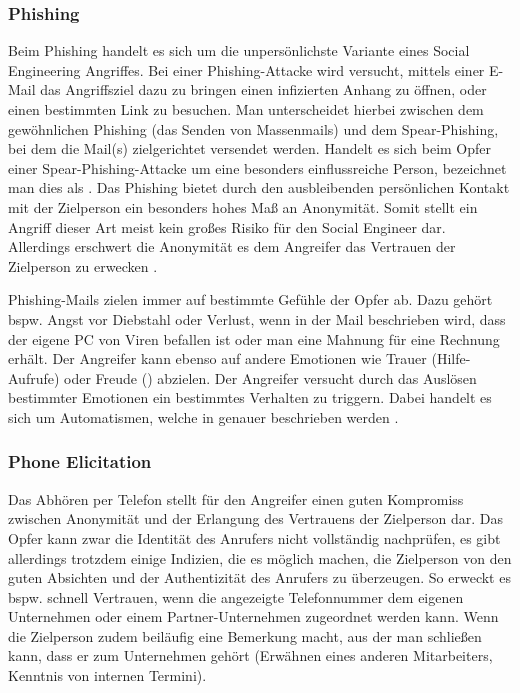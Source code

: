 \subsubsection{Phishing}
Beim Phishing handelt es sich um die unpersönlichste Variante eines Social Engineering Angriffes.
Bei einer Phishing-Attacke wird versucht, mittels einer E-Mail das Angriffsziel dazu zu bringen einen infizierten Anhang zu öffnen, oder einen bestimmten Link zu besuchen. Man unterscheidet hierbei zwischen dem gewöhnlichen Phishing (das Senden von Massenmails) und dem Spear-Phishing, bei dem die Mail(s) zielgerichtet versendet werden. Handelt es sich beim Opfer einer Spear-Phishing-Attacke um eine besonders einflussreiche Person, bezeichnet man dies als  \citep{hadnagy}.
Das Phishing bietet durch den ausbleibenden persönlichen Kontakt mit der Zielperson ein besonders hohes Maß an Anonymität. Somit stellt ein Angriff dieser Art meist kein großes Risiko für den Social Engineer dar.
Allerdings erschwert die Anonymität es dem Angreifer das Vertrauen der Zielperson zu erwecken \citep{hacking-the-human}.

Phishing-Mails zielen immer auf bestimmte Gefühle der Opfer ab. Dazu gehört bspw. Angst vor Diebstahl oder Verlust, wenn in der Mail beschrieben wird, dass der eigene PC von Viren befallen ist oder man eine Mahnung für eine Rechnung erhält.
Der Angreifer kann ebenso auf andere Emotionen wie Trauer (Hilfe-Aufrufe) oder Freude () abzielen.
Der Angreifer versucht durch das Auslösen bestimmter Emotionen ein bestimmtes Verhalten zu triggern. Dabei handelt es sich um Automatismen, welche in  genauer beschrieben werden \citep{hadnagy}.


\subsubsection{Phone Elicitation}\label{sec:phone-elicitation}
Das Abhören per Telefon stellt für den Angreifer einen guten Kompromiss zwischen Anonymität und der Erlangung des Vertrauens der Zielperson dar.
Das Opfer kann zwar die Identität des Anrufers nicht vollständig nachprüfen, es gibt allerdings trotzdem einige Indizien, die es möglich machen, die Zielperson von den guten Absichten und der Authentizität des Anrufers zu überzeugen.
So erweckt es bspw. schnell Vertrauen, wenn die angezeigte Telefonnummer dem eigenen Unternehmen oder einem Partner-Unternehmen zugeordnet werden kann.
Wenn die Zielperson zudem beiläufig eine Bemerkung macht, aus der man schließen kann, dass er zum Unternehmen gehört (Erwähnen eines anderen Mitarbeiters, Kenntnis von internen Termini).

